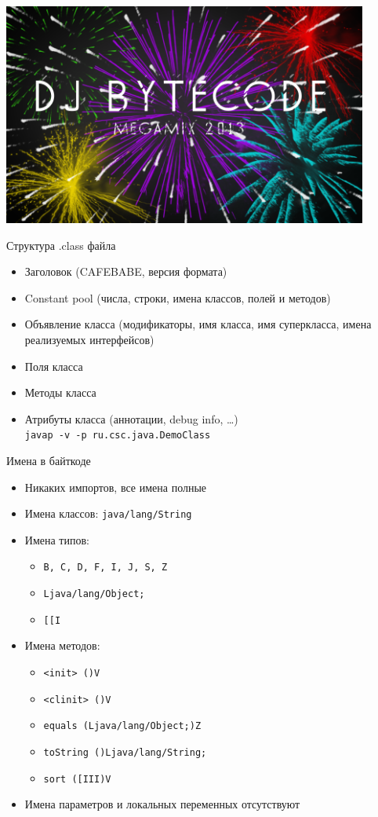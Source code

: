 \documentclass[unicode]{beamer}
\begin{document}
\begin{frame}
\centering
\includegraphics[width=0.9\textwidth]{pics/dj_bytecode.png}
\end{frame}


\begin{frame}{Структура .class файла}
\begin{itemize}
\item Заголовок (CAFEBABE, версия формата)
\item Constant pool (числа, строки, имена классов, полей и методов)
\item Объявление класса (модификаторы, имя класса, имя суперкласса,
имена реализуемых интерфейсов)
\item Поля класса
\item Методы класса
\item Атрибуты класса (аннотации, debug info, \ldots)\\
    \texttt{javap -v -p ru.csc.java.DemoClass}
\end{itemize}
\end{frame}


\begin{frame}{Имена в байткоде}
\begin{itemize}
\item Никаких импортов, все имена полные
\item Имена классов: \texttt{java/lang/String}
\item Имена типов:
    \begin{itemize}
    \item \texttt{B, C, D, F, I, J, S, Z}
    \item \texttt{Ljava/lang/Object;}
    \item \texttt{[[I}
    \end{itemize}
\item Имена методов:
    \begin{itemize}
    \item \texttt{<init> ()V}
    \item \texttt{<clinit> ()V}
    \item \texttt{equals (Ljava/lang/Object;)Z}
    \item \texttt{toString ()Ljava/lang/String;}
    \item \texttt{sort ([III)V}
    \end{itemize}
\item Имена параметров и локальных переменных отсутствуют
\end{itemize}
\end{frame}
\end{document}
